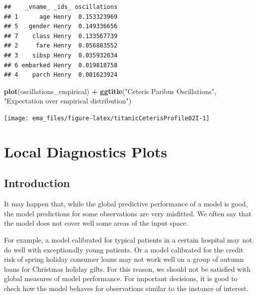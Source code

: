 \documentclass[12pt,]{krantz}
\newenvironment{Shaded}{\begin{snugshade}}{\end{snugshade}}
\newcommand{\DataTypeTok}[1]{\textcolor[rgb]{0.13,0.29,0.53}{#1}}
\newcommand{\KeywordTok}[1]{\textcolor[rgb]{0.13,0.29,0.53}{\textbf{#1}}}
\newcommand{\NormalTok}[1]{#1}
\newcommand{\OperatorTok}[1]{\textcolor[rgb]{0.81,0.36,0.00}{\textbf{#1}}}
\newcommand{\StringTok}[1]{\textcolor[rgb]{0.31,0.60,0.02}{#1}}
\begin{document}
\begin{Shaded}
\end{Shaded}

\begin{verbatim}
##    _vname_ _ids_ oscillations
## 1      age Henry  0.153323969
## 5   gender Henry  0.149336656
## 7    class Henry  0.133567739
## 2     fare Henry  0.056883552
## 3    sibsp Henry  0.035932034
## 6 embarked Henry  0.019818758
## 4    parch Henry  0.001623924
\end{verbatim}

\begin{Shaded}
\begin{Highlighting}[]
\KeywordTok{plot}\NormalTok{(oscillations_empirical) }\OperatorTok{+}\StringTok{ }\KeywordTok{ggtitle}\NormalTok{(}\StringTok{"Ceteris Paribus Oscillations"}\NormalTok{, }\StringTok{"Expectation over empirical distribution"}\NormalTok{)}
\end{Highlighting}
\end{Shaded}

\begin{center}\texttt{[image: ema\_files/figure-latex/titanicCeterisProfile02I-1]} \end{center}

\hypertarget{localDiagnostics}{%
\section{Local Diagnostics Plots}\label{localDiagnostics}}

\hypertarget{cPLocDiagIntro}{%
\subsection{Introduction}\label{cPLocDiagIntro}}

It may happen that, while the global predictive performance of a model is good, the model predictions for some observations are very misfitted. We often say that the model does not cover well some areas of the input space.

For example, a model calibrated for typical patients in a certain hospital may not do well with exceptionally young patients. Or a model calibrated for the credit risk of spring holiday consumer loans may not work well on a group of autumn loans for Christmas holiday gifts.
For this reason, we should not be satisfied with global measures of model performance. For important decisions, it is good to check how the model behaves for observations similar to the instance of interest.
\end{document}
